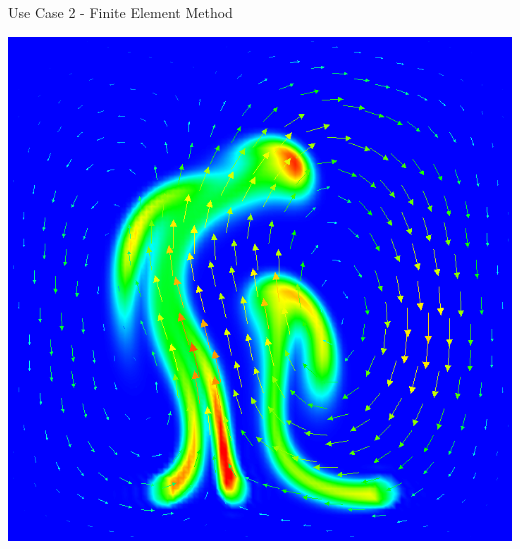 \documentclass[compress,newPxFont,sthlmFooter]{beamer}
\begin{document}
\begin{frame}[plain]{Use Case 2 - Finite Element Method}
\begin{center}
        \includegraphics[align=c, height=0.30\textheight]{buoyancy.png}
    \end{center}
\end{frame}
\end{document}
